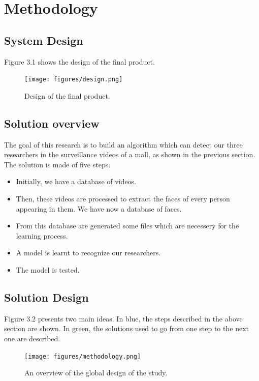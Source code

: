 \setlength{\footskip}{8mm}

\chapter{Methodology}
\label{ch:methodology}

\section{System Design}
Figure 3.1 shows the design of the final product. 
\begin{figure}[!ht]
  \centering
  \texttt{[image: figures/design.png]}  
  \caption[Design of the final product.]{Design of the final product.}
  \label{fig:Design}
\end{figure}
\FloatBarrier

\section{Solution overview}

The goal of this research is to build an algorithm which can detect our three researchers in the surveillance videos of a mall, as shown in the previous section. The solution is made of five steps.
\begin{itemize}
\item Initially, we have a database of videos.\newline
\item Then, these videos are processed to extract the faces of every person appearing in them. We have now a database of faces.\newline
\item From this database are generated some files which are necessery for the learning process.\newline
\item A model is learnt to recognize our researchers.\newline
\item The model is tested.
\end{itemize}

\section{Solution Design}

Figure 3.2 presents two main ideas. In blue, the steps described in the above section are shown. In green, the solutions used to go from one step to the next one are described.\newline
\begin{figure}[!ht]
  \centering
  \texttt{[image: figures/methodology.png]}  
  \caption[An overview of the global design of the study.]{An overview of the global design of the study.}
  \label{fig:Methodology}
\end{figure}
\FloatBarrier

